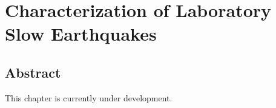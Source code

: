 \chapter{Characterization of Laboratory Slow Earthquakes}

\section{Abstract}
This chapter is currently under development.